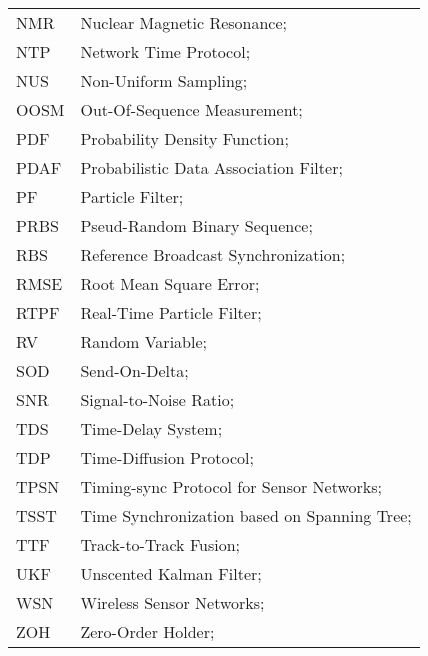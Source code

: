 \begin{longtable}{ll}
	NMR 		& Nuclear Magnetic Resonance; \\
	NTP			& Network Time Protocol; \\
	NUS 		& Non-Uniform Sampling; \\ 
	OOSM 		& Out-Of-Sequence Measurement; \\
	PDF         & Probability Density Function; \\
	PDAF		& Probabilistic Data Association Filter; \\
	PF 			& Particle Filter; \\
	PRBS		& Pseud-Random Binary Sequence; \\
	RBS			& Reference Broadcast Synchronization; \\
	RMSE		& Root Mean Square Error; \\
	RTPF		& Real-Time Particle Filter; \\
	RV			& Random Variable; \\
	SOD			& Send-On-Delta; \\
	SNR			& Signal-to-Noise Ratio; \\
	TDS			& Time-Delay System; \\
	TDP			& Time-Diffusion Protocol; \\
	TPSN		& Timing-sync Protocol for Sensor Networks; \\
	TSST		& Time Synchronization based on Spanning Tree; \\
	TTF 		& Track-to-Track Fusion; \\
	UKF			& Unscented Kalman Filter; \\
	WSN			& Wireless Sensor Networks; \\
	ZOH			& Zero-Order Holder; \\
\end{longtable}

